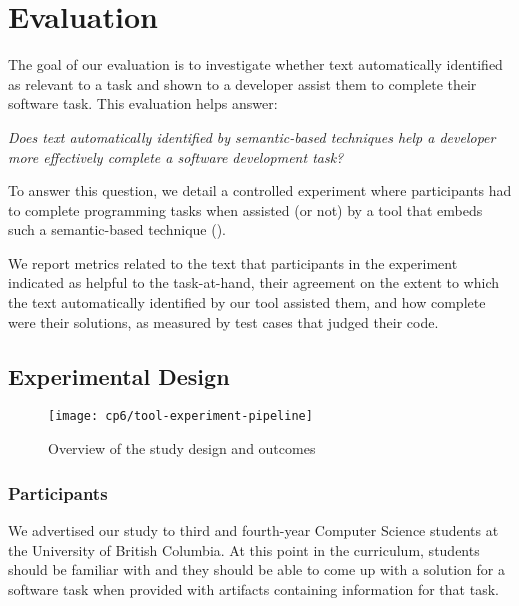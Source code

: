 \clearpage

\section{Evaluation}
\label{cp6:evaluation}


The goal of our evaluation is to investigate whether text automatically identified
as relevant to a task and shown to a developer assist them to complete their software task.
This evaluation helps answer: 


\medskip
\begin{bluequote}
    \textit{ Does text automatically identified by semantic-based techniques help a 
    developer more effectively complete a software development task?} 
\end{bluequote}


To answer this question, we detail a controlled experiment where participants 
had to complete  programming tasks when assisted (or not) by a
 tool that embeds such a semantic-based technique (). 


We report metrics related to the text that participants in the experiment indicated as helpful to the task-at-hand, their agreement on the extent to which the text automatically identified by our tool 
assisted them, and how complete were their solutions, as measured by test cases that judged
their code.


\subsection{Experimental Design}

\clearpage

\begin{figure}
    \centering
    \texttt{[image: cp6/tool-experiment-pipeline]}
    \caption{Overview of the study design and outcomes}
    \label{fig:cp6-experiment-overview}
\end{figure}

\clearpage

\subsubsection{Participants}



We advertised our study to third and fourth-year Computer Science students at the University of British Columbia. 
At this point in the curriculum, students should be familiar with  and they should be able to come up with a solution 
for a software task when provided with artifacts containing information for that task.


